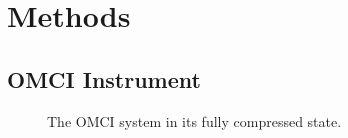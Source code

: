 \section{Methods}
\label{chap:omci:methods}

\subsection{OMCI Instrument}
\begin{figure}
    \begin{center}
    \end{center}
    \caption{The \ac{OMCI} system in its fully compressed state. } 
    \label{fig:OMCISystem}
\end{figure} 

